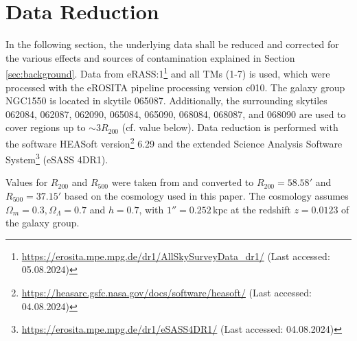 
\chapter{Data Reduction}
\label{sec:data_reduction}
In the following section, the underlying data shall be reduced and corrected for the various effects and sources of contamination explained in Section \ref{sec:background}. Data from eRASS:1\footnote{\url{https://erosita.mpe.mpg.de/dr1/AllSkySurveyData_dr1/} (Last accessed: 05.08.2024)} and all TMs (1-7) is used, which were processed with the eROSITA pipeline processing version c010. The galaxy group NGC1550 is located in skytile 065087. Additionally, the surrounding skytiles 062084, 062087, 062090, 065084, 065090, 068084, 068087, and 068090 are used to cover regions up to \(\sim 3R_{200}\) (cf. value below). Data reduction is performed with the software HEASoft version\footnote{\url{https://heasarc.gsfc.nasa.gov/docs/software/heasoft/} (Last accessed: 04.08.2024)} 6.29 and the extended Science Analysis Software System\footnote{\url{https://erosita.mpe.mpg.de/dr1/eSASS4DR1/} (Last accessed: 04.08.2024)} (eSASS 4DR1). 

Values for \(R_{200}\) and \(R_{500}\) were taken from \cite{Reiprich_2002} and converted to \(R_{200} = 58.58'\) and \(R_{500} = 37.15'\) based on the cosmology used in this paper. The cosmology assumes \(\Omega_m = 0.3, \Omega_\Lambda = 0.7\) and \(h = 0.7\), with \(1'' = 0.252\,\text{kpc}\) at the redshift \(z=0.0123\) of the galaxy group. 
